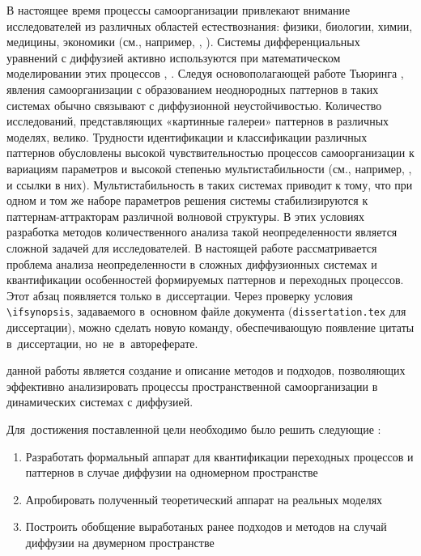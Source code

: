 
{\actuality} 
\ifsynopsis
В настоящее время процессы самоорганизации привлекают внимание исследователей из различных областей естествознания: физики, биологии, химии, медицины, экономики (см., например, \cite{field1985oscillations}, \cite{kuramoto1984chemical}). Системы дифференциальных уравнений с диффузией активно используются при математическом моделировании этих процессов \cite{hoyle2006pattern}, \cite{cross2009pattern}. Следуя основополагающей работе Тьюринга \cite{turing1990chemical}, явления самоорганизации с образованием неоднородных паттернов в таких системах обычно связывают с диффузионной неустойчивостью. Количество исследований, представляющих «картинные галереи» паттернов в различных моделях, велико. Трудности идентификации и классификации различных паттернов обусловлены высокой чувствительностью процессов самоорганизации к вариациям параметров и высокой степенью мультистабильности (см., например, \cite{kolinichenko2020multistability}, \cite{bib4} и ссылки в них). Мультистабильность в таких системах приводит к тому, что при одном и том же наборе параметров решения системы стабилизируются к паттернам-аттракторам различной волновой структуры. В этих условиях разработка методов количественного анализа такой неопределенности является сложной задачей для исследователей. В настоящей работе рассматривается проблема анализа неопределенности в сложных диффузионных системах и квантификации особенностей формируемых паттернов и переходных процессов.
\else
Этот абзац появляется только в~диссертации.
Через проверку условия \verb!\!\verb!ifsynopsis!, задаваемого в~основном файле
документа (\verb!dissertation.tex! для диссертации), можно сделать новую
команду, обеспечивающую появление цитаты в~диссертации, но~не~в~автореферате.
\fi


{\aim} данной работы является создание и описание методов и подходов, позволяющих эффективно анализировать процессы пространственной самоорганизации в динамических системах с диффузией.

Для~достижения поставленной цели необходимо было решить следующие {\tasks}:
\begin{enumerate}[beginpenalty=10000] %
  \item Разработать формальный аппарат для квантификации переходных процессов и паттернов в случае диффузии на одномерном пространстве
  \item Апробировать полученный теоретический аппарат на реальных моделях 
  \item Построить обобщение выработаных ранее подходов и методов на случай диффузии на двумерном пространстве
\end{enumerate}


